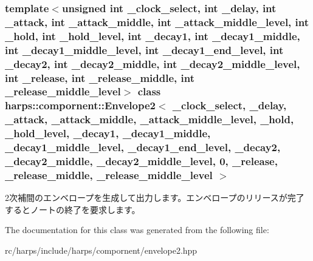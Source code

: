 \subsubsection*{template$<$unsigned int \_\-clock\_\-select, int \_\-delay, int \_\-attack, int \_\-attack\_\-middle, int \_\-attack\_\-middle\_\-level, int \_\-hold, int \_\-hold\_\-level, int \_\-decay1, int \_\-decay1\_\-middle, int \_\-decay1\_\-middle\_\-level, int \_\-decay1\_\-end\_\-level, int \_\-decay2, int \_\-decay2\_\-middle, int \_\-decay2\_\-middle\_\-level, int \_\-release, int \_\-release\_\-middle, int \_\-release\_\-middle\_\-level$>$ class harps::compornent::Envelope2$<$ \_\-clock\_\-select, \_\-delay, \_\-attack, \_\-attack\_\-middle, \_\-attack\_\-middle\_\-level, \_\-hold, \_\-hold\_\-level, \_\-decay1, \_\-decay1\_\-middle, \_\-decay1\_\-middle\_\-level, \_\-decay1\_\-end\_\-level, \_\-decay2, \_\-decay2\_\-middle, \_\-decay2\_\-middle\_\-level, 0, \_\-release, \_\-release\_\-middle, \_\-release\_\-middle\_\-level $>$}

2次補間のエンベロープを生成して出力します。エンベロープのリリースが完了するとノートの終了を要求します。 

The documentation for this class was generated from the following file:\begin{CompactItemize}
\item 
rc/harps/include/harps/compornent/envelope2.hpp\end{CompactItemize}
